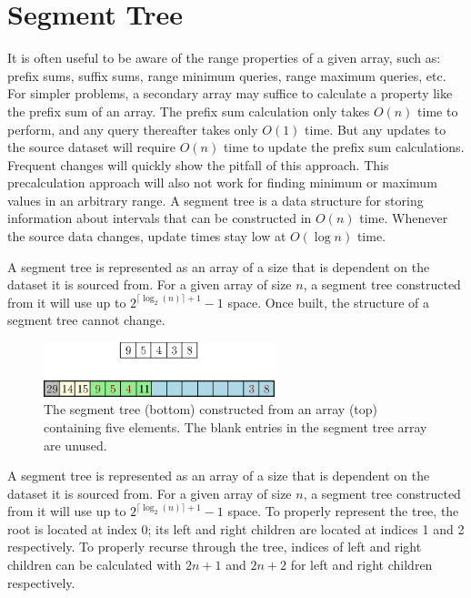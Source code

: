 \section{Segment Tree}


It is often useful to be aware of the range properties of a given array, such as: prefix sums, suffix sums, range minimum queries, range maximum queries, etc.
For simpler problems, a secondary array may suffice to calculate a property like the prefix sum of an array.
The prefix sum calculation only takes $O(n)$ time to perform, and any query thereafter takes only $O(1)$ time.
But any updates to the source dataset will require $O(n)$ time to update the prefix sum calculations.
Frequent changes will quickly show the pitfall of this approach.
This precalculation approach will also not work for finding minimum or maximum values in an arbitrary range.
A segment tree is a data structure for storing information about intervals that can be constructed in $O(n)$ time.
Whenever the source data changes, update times stay low at $O(\log n)$ time.



A segment tree is represented as an array of a size that is dependent on the dataset it is sourced from.
For a given array of size $n$, a segment tree constructed from it will use up to $2^{\lceil \log_2 (n)\rceil + 1} - 1$ space.
Once built, the structure of a segment tree cannot change.



\begin{figure}[h]
    \centering
    \includegraphics[width=0.6\textwidth]{./structures/segment-tree/source-array}
    \caption{\small The segment tree (bottom) constructed from an array (top) containing five elements.
      The blank entries in the segment tree array are unused.}
\end{figure}

A segment tree is represented as an array of a size that is dependent on the dataset it is sourced from.
For a given array of size $n$, a segment tree constructed from it will use up to $2^{\lceil \log_2 (n)\rceil + 1} - 1$ space.
To properly represent the tree, the root is located at index 0; its left and right children are located at indices 1 and 2 respectively.
To properly recurse through the tree, indices of left and right children can be calculated with $2n + 1$ and $2n + 2$ for left and right children respectively.

